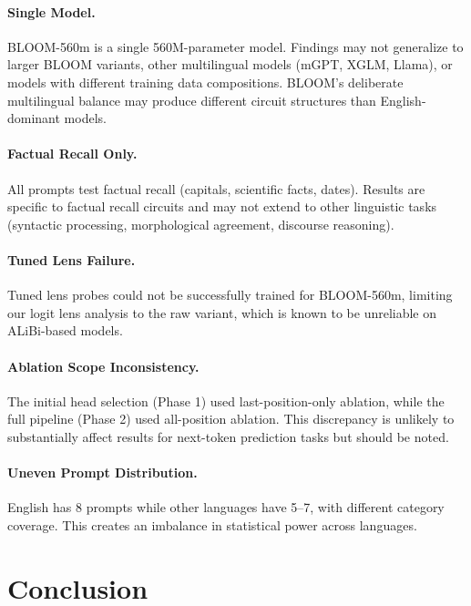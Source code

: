 \documentclass[11pt]{article}
\begin{document}
\paragraph{Single Model.}
BLOOM-560m is a single 560M-parameter model.
Findings may not generalize to larger BLOOM variants, other multilingual models (mGPT, XGLM, Llama), or models with different training data compositions.
BLOOM's deliberate multilingual balance may produce different circuit structures than English-dominant models.

\paragraph{Factual Recall Only.}
All prompts test factual recall (capitals, scientific facts, dates).
Results are specific to factual recall circuits and may not extend to other linguistic tasks (syntactic processing, morphological agreement, discourse reasoning).

\paragraph{Tuned Lens Failure.}
Tuned lens probes could not be successfully trained for BLOOM-560m, limiting our logit lens analysis to the raw variant, which is known to be unreliable on ALiBi-based models.

\paragraph{Ablation Scope Inconsistency.}
The initial head selection (Phase 1) used last-position-only ablation, while the full pipeline (Phase 2) used all-position ablation.
This discrepancy is unlikely to substantially affect results for next-token prediction tasks but should be noted.

\paragraph{Uneven Prompt Distribution.}
English has 8 prompts while other languages have 5--7, with different category coverage.
This creates an imbalance in statistical power across languages.

\section{Conclusion}
\end{document}
